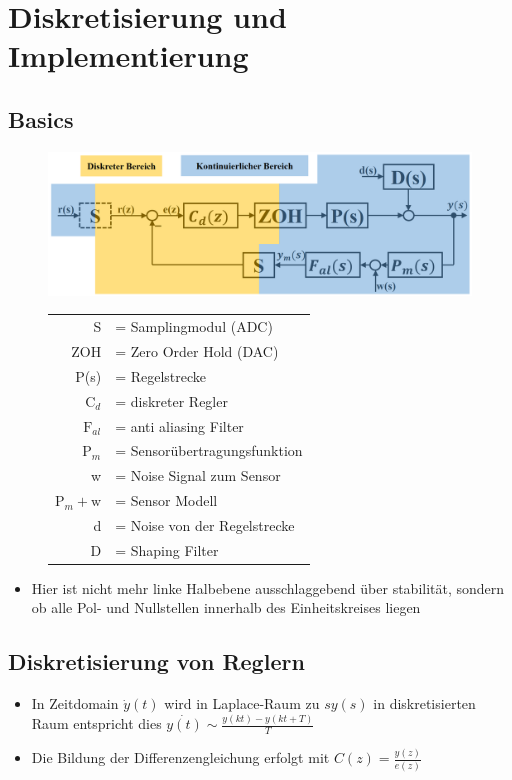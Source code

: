 \section{Diskretisierung und Implementierung}
\subsection{Basics}
\begin{figure}[h!]
	\begin{minipage}{0.5\linewidth}
		\centering
		\includegraphics[width=.9\linewidth]{bilder/DiskretesSystem}
		\label{fig:diskretessystem}
	\end{minipage}
	\begin{minipage}{0.45\linewidth}
		\footnotesize
		\begin{tabular}{rl}
			S 						&= Samplingmodul (ADC)\\
			ZOH 					&= Zero Order Hold (DAC)\\
			P(s)					&= Regelstrecke\\
			$\text{C}_d$			&= diskreter Regler\\
			$\text{F}_{al}$			&= anti aliasing Filter\\
			$\text{P}_m$			&= Sensorübertragungsfunktion\\
			w						&= Noise Signal zum Sensor\\
			$\text{P}_m+\text{w}$	&= Sensor Modell\\
			d						&= Noise von der Regelstrecke\\
			D						&= Shaping Filter
		\end{tabular}
	\end{minipage}
\end{figure}
\begin{itemize}
	\item Hier ist nicht mehr linke Halbebene ausschlaggebend über stabilität, sondern ob alle Pol- und Nullstellen innerhalb des Einheitskreises liegen
\end{itemize}

\subsection{Diskretisierung von Reglern}
\begin{itemize}
	\item In Zeitdomain $\dot{y}(t) $ wird in Laplace-Raum zu $sy(s)$ in diskretisierten Raum entspricht dies $\dot{y(t)}\sim\frac{y(kt)-y(kt+T)}{T}$
	\item Die Bildung der Differenzengleichung erfolgt mit $C(z) = \frac{y(z)}{e(z)}$
\end{itemize}
